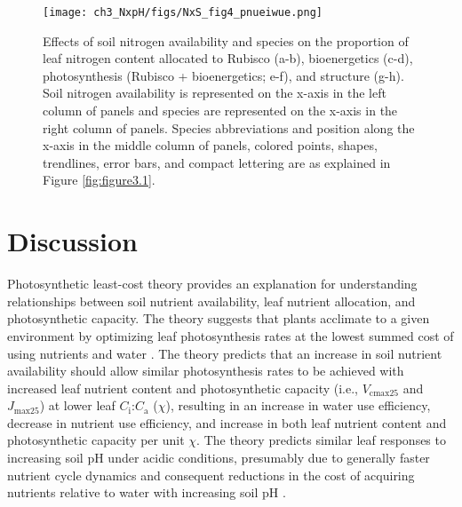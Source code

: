     \newpage
    \begin{figure}
        \texttt{[image: ch3\_NxpH/figs/NxS\_fig4\_pnueiwue.png]}
        \centering
        \caption[Effects of soil N availability, species, and leaf N content on tradeoffs between nitrogen and water use]{Effects of soil nitrogen availability and species on the proportion of leaf nitrogen content allocated to Rubisco (a-b), bioenergetics (c-d), photosynthesis (Rubisco + bioenergetics; e-f), and structure (g-h). Soil nitrogen availability is represented on the x-axis in the left column of panels and species are represented on the x-axis in the right column of panels. Species abbreviations and position along the x-axis in the middle column of panels, colored points, shapes, trendlines, error bars, and compact lettering are as explained in Figure \ref{fig:figure3.1}.}
        \label{fig:figure3.4}
    \end{figure}
    \clearpage

    \section{Discussion}

    Photosynthetic least-cost theory provides an explanation for understanding relationships between soil nutrient availability, leaf nutrient allocation, and photosynthetic capacity. The theory suggests that plants acclimate to a given environment by optimizing leaf photosynthesis rates at the lowest summed cost of using nutrients and water . The theory predicts that an increase in soil nutrient availability should allow similar photosynthesis rates to be achieved with increased leaf nutrient content and photosynthetic capacity (i.e., $V_\mathrm{cmax25}$ and $J_\mathrm{max25}$) at lower leaf $C_\mathrm{i}$:$C_\mathrm{a}$ ($\chi$), resulting in an increase in water use efficiency, decrease in nutrient use efficiency, and increase in both leaf nutrient content and photosynthetic capacity per unit $\chi$. The theory predicts similar leaf responses to increasing soil pH under acidic conditions, presumably due to generally faster nutrient cycle dynamics and consequent reductions in the cost of acquiring nutrients relative to water with increasing soil pH .
    
